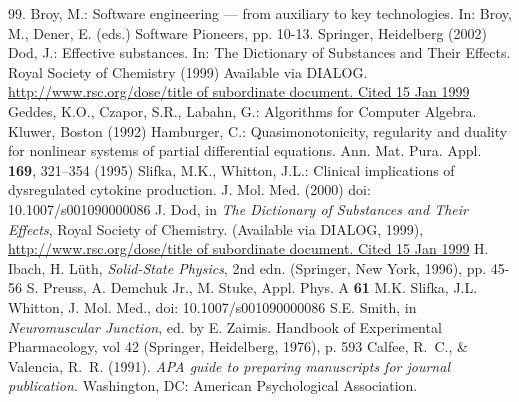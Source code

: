 \begin{thebibliography}{99.}%
%
%
 Broy, M.: Software engineering --- from auxiliary to key technologies. In: Broy, M., Dener, E. (eds.) Software Pioneers, pp. 10-13. Springer, Heidelberg (2002)
%
 Dod, J.: Effective substances. In: The Dictionary of Substances and Their Effects. Royal Society of Chemistry (1999) Available via DIALOG. \\
\url{http://www.rsc.org/dose/title of subordinate document. Cited 15 Jan 1999}
%
 Geddes, K.O., Czapor, S.R., Labahn, G.: Algorithms for Computer Algebra. Kluwer, Boston (1992) 
%
 Hamburger, C.: Quasimonotonicity, regularity and duality for nonlinear systems of partial differential equations. Ann. Mat. Pura. Appl. \textbf{169}, 321--354 (1995)
%
 Slifka, M.K., Whitton, J.L.: Clinical implications of dysregulated cytokine production. J. Mol. Med. (2000) doi: 10.1007/s001090000086 
%
%
 J. Dod, in \textit{The Dictionary of Substances and Their Effects}, Royal Society of Chemistry. (Available via DIALOG, 1999), 
\url{http://www.rsc.org/dose/title of subordinate document. Cited 15 Jan 1999}
%
 H. Ibach, H. L\"uth, \textit{Solid-State Physics}, 2nd edn. (Springer, New York, 1996), pp. 45-56 
%
 S. Preuss, A. Demchuk Jr., M. Stuke, Appl. Phys. A \textbf{61}
%
 M.K. Slifka, J.L. Whitton, J. Mol. Med., doi: 10.1007/s001090000086
%
 S.E. Smith, in \textit{Neuromuscular Junction}, ed. by E. Zaimis. Handbook of Experimental Pharmacology, vol 42 (Springer, Heidelberg, 1976), p. 593
%
%
%
 Calfee, R.~C., \& Valencia, R.~R. (1991). \textit{APA guide to preparing manuscripts for journal publication.} Washington, DC: American Psychological Association.

\end{thebibliography}
